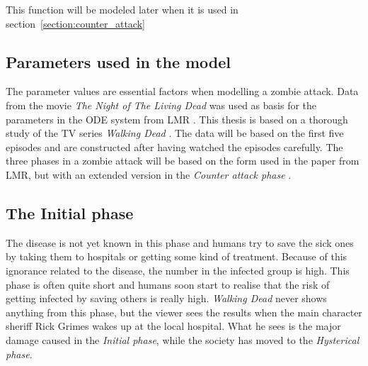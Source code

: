 \documentclass[%
twoside,                 %
final,                   %
chapterprefix=true,      %
open=right               %
10pt]{book}
\begin{document}
\noindent
This function will be modeled later when it is used in section~\ref{section:counter_attack}


\vspace{3mm}




\vspace{3mm}



\subsection{Parameters used in the model}
The parameter values are essential factors when modelling a zombie attack. Data from the movie \emph{The Night of The Living Dead} was used as basis for the parameters in the ODE system from LMR \cite{zombie-math}. This thesis is based on a thorough study of the TV series \emph{Walking Dead} \cite{walking_dead}. The data will be based on the first five episodes and are constructed after having watched the episodes carefully. The three phases in a zombie attack will be based on the form used in the paper from LMR, but with an extended version in the \emph{Counter attack phase} .

\subsection{The Initial phase}
The disease is not yet known in this phase and humans try to save the sick ones by taking them to hospitals or getting some kind of treatment. Because of this ignorance related to the disease, the number in the infected group is high. This phase is often quite short and humans soon start to realise that the risk of getting infected by saving others is really high. \emph{Walking Dead} never shows anything from this phase, but the viewer sees the results when the main character sheriff Rick Grimes wakes up at the local hospital. What he sees is the major damage caused in the \emph{Initial phase}, while the society has moved to the \emph{Hysterical phase}.


\vspace{3mm}




\vspace{3mm}
\end{document}
